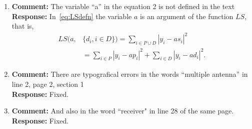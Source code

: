 \documentclass{article}
\newcommand{\abs}[1]{{\left\vert #1 \right\vert}}
\begin{document}
\begin{enumerate}

\item \textbf{Comment:}  The variable  ``a'' in the equation 2 is not defined in the text \\
\textbf{Response:} In~\eqref{eq:LSdefn} the variable $a$ is an argument of the function $LS$, that is,
\[
\begin{split}
LS(a, &\{d_i, i \in D\}) = \sum_{i \in P \cup D} \abs{ y_i - a s_i }^2  \\
&= \sum_{i \in P} \abs{ y_i - a p_i }^2 + \sum_{i \in D} \abs{ y_i - a d_i }^2.
\end{split}
\]

\item \textbf{Comment:}  There are typografical errors in the words  ``multiple antenna'' in line 2, page 2, section 1 \\
\textbf{Response:} Fixed.

\item \textbf{Comment:}  And also in the word ``receiver" in line 28 of the same page.
 \\
\textbf{Response:} Fixed.


\end{enumerate}


\end{document}

